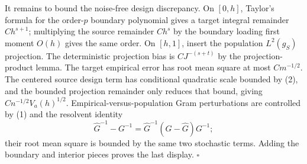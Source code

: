 It remains to bound the noise-free design discrepancy. On \([0,h]\), Taylor's formula for the order-\(p\) boundary polynomial gives a target integral remainder \(Ch^{s+1}\); multiplying the source remainder \(Ch^s\) by the boundary loading first moment \(O(h)\) gives the same order. On \([h,1]\), insert the population \(L^2(g_S)\) projection. The deterministic projection bias is \(CJ^{-(s+t)}\) by the projection-product lemma. The target empirical error has root mean square at most \(Cm^{-1/2}\). The centered source design term has conditional quadratic scale bounded by (2), and the bounded projection remainder only reduces that bound, giving \(Cn^{-1/2}V_a(h)^{1/2}\). Empirical-versus-population Gram perturbations are controlled by (1) and the resolvent identity
\[
\widehat G^{-1}-G^{-1}=\widehat G^{-1}(G-\widehat G)G^{-1};
\]
their root mean square is bounded by the same two stochastic terms. Adding the boundary and interior pieces proves the last display. \(\square\)